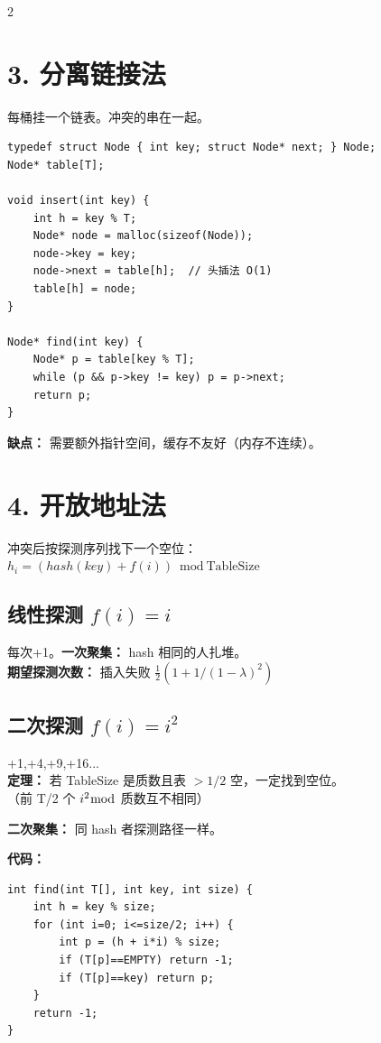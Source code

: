 \documentclass[10pt,a4paper]{article}
\begin{document}
\begin{multicols}{2}
\section*{3. 分离链接法}

每桶挂一个链表。冲突的串在一起。

\begin{lstlisting}
typedef struct Node { int key; struct Node* next; } Node;
Node* table[T];

void insert(int key) {
    int h = key % T;
    Node* node = malloc(sizeof(Node));
    node->key = key;
    node->next = table[h];  // 头插法 O(1)
    table[h] = node;
}

Node* find(int key) {
    Node* p = table[key % T];
    while (p && p->key != key) p = p->next;
    return p;
}
\end{lstlisting}

\textbf{缺点：} 需要额外指针空间，缓存不友好（内存不连续）。

\columnbreak

\section*{4. 开放地址法}

冲突后按探测序列找下一个空位：\\
$h_i = (hash(key) + f(i)) \bmod \text{TableSize}$

\subsection*{线性探测 $f(i)=i$}

每次+1。\textbf{一次聚集：} hash 相同的人扎堆。\\
\textbf{期望探测次数：} 插入失败 $\frac12(1+1/(1-\lambda)^2)$

\subsection*{二次探测 $f(i)=i^2$}

+1,+4,+9,+16...\\
\textbf{定理：} 若 TableSize 是质数且表 $>1/2$ 空，一定找到空位。\\
（前 T/2 个 $i^2 \bmod$ 质数互不相同）

\textbf{二次聚集：} 同 hash 者探测路径一样。

\textbf{代码：}
\begin{lstlisting}
int find(int T[], int key, int size) {
    int h = key % size;
    for (int i=0; i<=size/2; i++) {
        int p = (h + i*i) % size;
        if (T[p]==EMPTY) return -1;
        if (T[p]==key) return p;
    }
    return -1;
}
\end{lstlisting}


\end{multicols}
\end{document}

